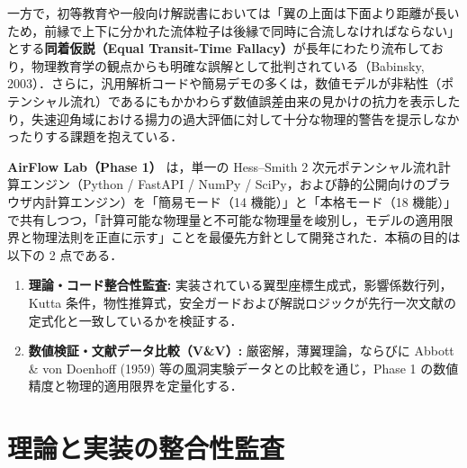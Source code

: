 \documentclass[10pt,a4paper]{article}
\begin{document}
一方で，初等教育や一般向け解説書においては「翼の上面は下面より距離が長いため，前縁で上下に分かれた流体粒子は後縁で同時に合流しなければならない」とする\textbf{同着仮説（Equal Transit-Time Fallacy）}が長年にわたり流布しており，物理教育学の観点からも明確な誤解として批判されている（Babinsky, 2003）．さらに，汎用解析コードや簡易デモの多くは，数値モデルが非粘性（ポテンシャル流れ）であるにもかかわらず数値誤差由来の見かけの抗力を表示したり，失速迎角域における揚力の過大評価に対して十分な物理的警告を提示しなかったりする課題を抱えている．

\textbf{AirFlow Lab（Phase 1）} は，単一の Hess--Smith 2 次元ポテンシャル流れ計算エンジン（Python / FastAPI / NumPy / SciPy，および静的公開向けのブラウザ内計算エンジン）を「簡易モード（14 機能）」と「本格モード（18 機能）」で共有しつつ，「計算可能な物理量と不可能な物理量を峻別し，モデルの適用限界と物理法則を正直に示す」ことを最優先方針として開発された．本稿の目的は以下の 2 点である．
\begin{enumerate}\setlength{\itemsep}{2pt}\setlength{\parskip}{0pt}
  \item \textbf{理論・コード整合性監査:} 実装されている翼型座標生成式，影響係数行列，Kutta 条件，物性推算式，安全ガードおよび解説ロジックが先行一次文献の定式化と一致しているかを検証する．
  \item \textbf{数値検証・文献データ比較（V\&V）:} 厳密解，薄翼理論，ならびに Abbott \& von Doenhoff (1959) 等の風洞実験データとの比較を通じ，Phase 1 の数値精度と物理的適用限界を定量化する．
\end{enumerate}

\section{理論と実装の整合性監査}
\end{document}
